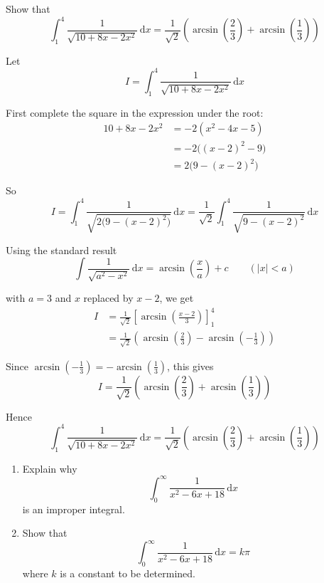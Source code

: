 \documentclass[leqno]{article}
\begin{document}
\begin{enumerate}[
  label=\textbf{\arabic*.},
  leftmargin=*,
  topsep=0pt,
  partopsep=0pt,
  parsep=0pt
]
Show that
\[
\int_{1}^{4} \frac{1}{\sqrt{10 + 8x - 2x^2}}\,\mathrm{d}x = \frac{1}{\sqrt{2}}\left(\arcsin \left(\frac{2}{3}\right) + \arcsin \left(\frac{1}{3}\right)\right)
\]

\vspace*{10pt}

\begin{djsSolution}
Let
\[
I=\int_{1}^{4}\frac{1}{\sqrt{10+8x-2x^2}}\,\mathrm{d}x
\]

First complete the square in the expression under the root:
\begin{align*}
10+8x-2x^2
&=-2(x^2-4x-5)\\
&=-2\bigl((x-2)^2-9\bigr)\\
&=2\bigl(9-(x-2)^2\bigr)
\end{align*}

So
\[
I=\int_{1}^{4}\frac{1}{\sqrt{2\bigl(9-(x-2)^2\bigr)}}\,\mathrm{d}x
=\frac{1}{\sqrt{2}}\int_{1}^{4}\frac{1}{\sqrt{9-(x-2)^2}}\,\mathrm{d}x
\]

Using the standard result
\[
\int \frac{1}{\sqrt{a^2-x^2}}\,\mathrm{d}x=\arcsin\left(\frac{x}{a}\right)+c\qquad (|x|<a)
\]

with $a=3$ and $x$ replaced by $x-2$, we get
\begin{align*}
I
&=\frac{1}{\sqrt{2}}\left[\arcsin\left(\frac{x-2}{3}\right)\right]_{1}^{4}\\
&=\frac{1}{\sqrt{2}}\left(\arcsin \left(\frac23\right)-\arcsin \left(-\frac13\right)\right)
\end{align*}

Since $\arcsin\left(-\frac13\right)=-\arcsin\left(\frac13\right)$, this gives
\[
I=\frac{1}{\sqrt{2}}\left(\arcsin \left(\frac23\right)+\arcsin \left(\frac13\right)\right)
\]

Hence
\[
\int_{1}^{4} \frac{1}{\sqrt{10 + 8x - 2x^2}}\,\mathrm{d}x
= \frac{1}{\sqrt{2}}\left(\arcsin \left(\frac{2}{3}\right) + \arcsin \left(\frac{1}{3}\right)\right)
\]
\end{djsSolution}


\newpage

\questionitem

\begin{enumerate}[label=\textbf{(\alph*)}]
  \item Explain why
  \[
  \int_{0}^{\infty} \frac{1}{x^2 - 6x + 18} \, \mathrm{d}x
  \]
  is an improper integral.  \\
  \item Show that
  \[
  \int_{0}^{\infty} \frac{1}{x^2 - 6x + 18} \, \mathrm{d}x = k\pi
  \]
  where $k$ is a constant to be determined.  \\
\end{enumerate}


\end{enumerate}
\end{document}
